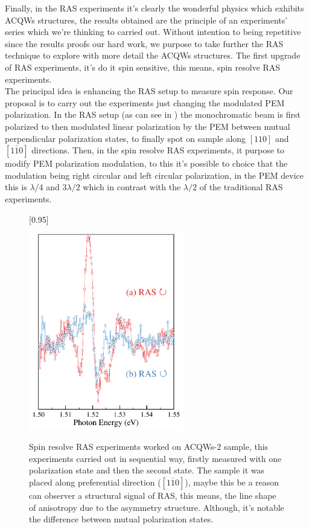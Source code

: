 Finally, in the RAS experiments  it's clearly the wonderful physics which exhibits ACQWs structures, the results obtained are the principle of an experiments' series  which we're thinking to carried out. Without intention to being  repetitive since the results proofs our hard work, we purpose to take further the RAS technique to explore with more detail the ACQWs structures. The first upgrade of RAS experiments, it's do it spin sensitive, this means, spin resolve RAS experiments. \\
The principal idea is enhancing the RAS setup to measure spin response. Our proposal is to carry out the experiments just changing the modulated PEM polarization. In the RAS setup (as can see in ) the monochromatic beam is first polarized to then  modulated linear polarization by the PEM between mutual perpendicular polarization states, to finally spot on sample along $[110]$ and $[1\overline{1}0]$ directions. Then, in the spin resolve RAS experiments, it purpose to modify PEM polarization modulation, to this it's possible to choice that the modulation being right circular and left circular polarization,  in the PEM device this is $\lambda/4$ and $3\lambda/2$ which in contrast with the  $\lambda/2$ of the traditional RAS experiments.  
\begin{figure}[H]
	[0.95\FBwidth]
	{ \caption{ Spin resolve RAS experiments worked on ACQWs-2 sample, this experiments carried out in sequential way, firstly measured with one polarization state and then the second state. The sample it was placed along preferential direction ($[1\overline{1}0]$), maybe this be a reason can observer a structural signal of RAS, this means, the line shape of  anisotropy due to the asymmetry structure. Although, it's notable the difference between mutual polarization states.
	}\label{fig:chapter-4-subsec-conclusion-ras-spin-1}}
	{
	\includegraphics[width=0.6\textwidth]{../figures/chapter-4/ras-spin/out/ras-spin-1.pdf}
	}
\end{figure}
